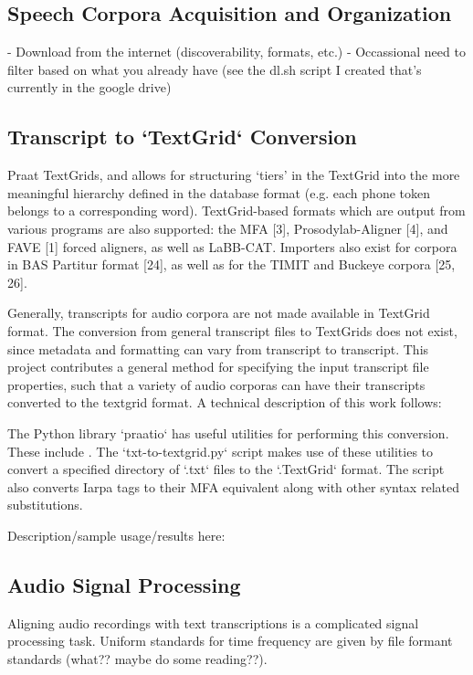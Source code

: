 \documentclass[11pt]{article}
\begin{document}
\subsection{Speech Corpora Acquisition and Organization}

- Download from the internet (discoverability, formats, etc.)
- Occassional need to filter based on what you already have (see the dl.sh script I created that's currently in the google drive)

\subsection{Transcript to `TextGrid` Conversion}

Praat  TextGrids, and allows for structuring ‘tiers’ in the TextGrid into the more meaningful hierarchy defined in the database format (e.g. each phone token belongs to a corresponding word). TextGrid-based formats which are output from various programs are also supported: the MFA [3], Prosodylab-Aligner [4], and FAVE [1] forced aligners, as well as LaBB-CAT. Importers also exist for corpora in BAS Partitur format [24], as well as for the TIMIT and Buckeye corpora [25, 26].

Generally, transcripts for audio corpora are not made available in TextGrid format. The conversion from general transcript files to TextGrids does not exist, since metadata and formatting can vary from transcript to transcript. This project contributes a general method for specifying the input transcript file properties, such that a variety of audio corporas can have their transcripts converted to the textgrid format. A technical description of this work follows:

The Python library `praatio`  has useful utilities for performing this conversion. These include . The `txt-to-textgrid.py` script makes use of these utilities to convert a specified directory of `.txt` files to the `.TextGrid` format. The script also converts Iarpa tags to their MFA equivalent along with other syntax related substitutions.

Description/sample usage/results here: 

\subsection{Audio Signal Processing}

Aligning audio recordings with text transcriptions is a complicated signal processing task. Uniform standards for time frequency are given by file formant standards (what?? maybe do some reading??).
\end{document}
